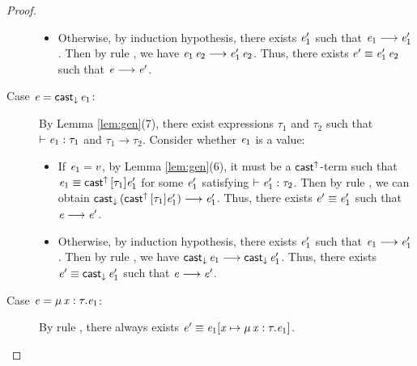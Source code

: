 \begin{proof}
\begin{description}
\begin{itemize}
    		    \item Otherwise, by induction hypothesis, there exists $\mathit{e'_{{\mathrm{1}}}}$ such that $\mathit{e_{{\mathrm{1}}}}  \longrightarrow  \mathit{e'_{{\mathrm{1}}}}$. Then by rule , we have $\mathit{e_{{\mathrm{1}}}} \, \mathit{e_{{\mathrm{2}}}}  \longrightarrow  \mathit{e'_{{\mathrm{1}}}} \, \mathit{e_{{\mathrm{2}}}}$. Thus, there exists $\mathit{e'}  \equiv  \mathit{e'_{{\mathrm{1}}}} \, \mathit{e_{{\mathrm{2}}}}$ such that $\mathit{e}  \longrightarrow  \mathit{e'}$.
    		\end{itemize}
		\item[Case $\mathit{e}=\mathsf{cast}_{\downarrow} \, \mathit{e_{{\mathrm{1}}}}$:] By Lemma \ref{lem:gen}(7), there exist expressions $\tau_{{\mathrm{1}}}$ and $\tau_{{\mathrm{2}}}$ such that $\vdash  \mathit{e_{{\mathrm{1}}}}  :  \tau_{{\mathrm{1}}}$ and $\tau_{{\mathrm{1}}}  \longrightarrow  \tau_{{\mathrm{2}}}$. Consider whether $\mathit{e_{{\mathrm{1}}}}$ is a value:
		     \begin{itemize}
    		    \item If $\mathit{e_{{\mathrm{1}}}}=v$, by Lemma \ref{lem:gen}(6), it must be a $ \mathsf{cast}^{\uparrow} $-term such that $\mathit{e_{{\mathrm{1}}}}  \equiv  \mathsf{cast}^{\uparrow} \, [  \tau_{{\mathrm{1}}}  ]  \mathit{e'_{{\mathrm{1}}}}$ for some $\mathit{e'_{{\mathrm{1}}}}$ satisfying $\vdash  \mathit{e'_{{\mathrm{1}}}}  :  \tau_{{\mathrm{2}}}$. Then by rule , we can obtain $\mathsf{cast}_{\downarrow} \, (  \mathsf{cast}^{\uparrow} \, [  \tau_{{\mathrm{1}}}  ]  \mathit{e'_{{\mathrm{1}}}}  )  \longrightarrow  \mathit{e'_{{\mathrm{1}}}}$. Thus, there exists $\mathit{e'}  \equiv  \mathit{e'_{{\mathrm{1}}}}$ such that $\mathit{e}  \longrightarrow  \mathit{e'}$.
    		    \item Otherwise, by induction hypothesis, there exists $\mathit{e'_{{\mathrm{1}}}}$ such that $\mathit{e_{{\mathrm{1}}}}  \longrightarrow  \mathit{e'_{{\mathrm{1}}}}$. Then by rule , we have $\mathsf{cast}_{\downarrow} \, \mathit{e_{{\mathrm{1}}}}  \longrightarrow  \mathsf{cast}_{\downarrow} \, \mathit{e'_{{\mathrm{1}}}}$. Thus, there exists $\mathit{e'}  \equiv  \mathsf{cast}_{\downarrow} \, \mathit{e'_{{\mathrm{1}}}}$ such that $\mathit{e}  \longrightarrow  \mathit{e'}$.
    		\end{itemize}
		\item[Case $\mathit{e}=\mu \, \mathit{x}  :  \tau  .  \mathit{e_{{\mathrm{1}}}}$:] By rule , there always exists $\mathit{e'}  \equiv  \mathit{e_{{\mathrm{1}}}}  [  \mathit{x}  \mapsto  \mu \, \mathit{x}  :  \tau  .  \mathit{e_{{\mathrm{1}}}}  ]$.
    \end{description}
\end{proof}

